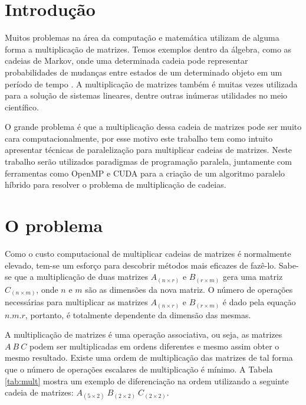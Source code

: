\documentclass[12pt,openright,oneside,chapter=TITLE,section=TITLE,
    brazil]{utfpr-pg}
\begin{document}
\frenchspacing

\imprimircapa



\textual
\pagestyle{simple}

\chapter{Introdução}
\vspace{-0.7cm}

Muitos problemas na área da computação e matemática utilizam de alguma forma a multiplicação de matrizes. Temos exemplos dentro da álgebra, como as cadeias de Markov, onde uma determinada cadeia pode representar probabilidades de mudanças entre estados de um determinado objeto em um período de tempo \cite{santos2002curso}. A multiplicação de matrizes também é muitas vezes utilizada para a solução de sistemas lineares, dentre outras inúmeras utilidades no meio científico.

O grande problema é que a multiplicação dessa cadeia de matrizes pode ser muito cara computacionalmente, por esse motivo este trabalho tem como intuito apresentar técnicas de paralelização para multiplicar cadeias de matrizes. Neste trabalho serão utilizados paradigmas de programação paralela, juntamente com ferramentas como OpenMP e CUDA para a criação de um algoritmo paralelo híbrido para resolver o problema de multiplicação de cadeias.

\vspace{1cm}
{\let\clearpage\relax \chapter{O problema}}
\vspace{-0.7cm}

Como o custo computacional de multiplicar cadeias de matrizes é normalmente elevado, tem-se um esforço para descobrir métodos mais eficazes de fazê-lo. Sabe-se que a multiplicação de duas matrizes $A_{(n \times r)}$ e $B_{(r \times m)}$ gera uma matriz $C_{(n \times m)}$, onde $n$ e $m$ são as dimensões da nova matriz. O número de operações necessárias para multiplicar as matrizes $A_{(n \times r)}$ e $B_{(r \times m)}$ é dado pela equação $n.m.r$, portanto, é totalmente dependente da dimensão das mesmas. 

A multiplicação de matrizes é uma operação associativa, ou seja, as matrizes $A \ B \ C$ podem ser multiplicadas em ordens diferentes e mesmo assim obter o mesmo resultado. Existe uma ordem de multiplicação das matrizes de tal forma que o número de operações escalares de multiplicação é mínimo. A Tabela \ref{tab:mult} mostra um exemplo de diferenciação na ordem utilizando a seguinte cadeia de matrizes: $A_{(5 \times 2)} \ B_{(2 \times 2)} \ C_{(2 \times 2)}$.
\end{document}
